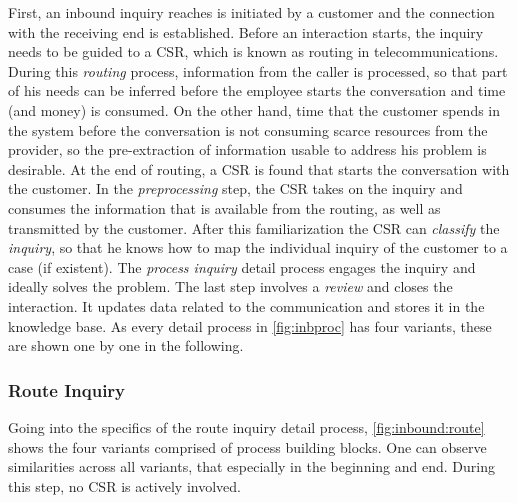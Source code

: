 	 First, an inbound inquiry reaches is initiated by a customer and the connection with the receiving end is established. Before an interaction starts, the inquiry needs to be guided to a \acrshort{CSR}, which is known as routing in telecommunications. During this \textit{routing} process, information from the caller is processed, so that part of his needs can be inferred before the employee starts the conversation and time (and money) is consumed. On the other hand, time that the customer spends in the system before the conversation is not consuming scarce resources from the provider, so the pre-extraction of information usable to address his problem is desirable. At the end of routing, a \acrshort{CSR} is found that starts the conversation with the customer. In the \textit{preprocessing} step, the \acrshort{CSR} takes on the inquiry and consumes the information that is available from the routing, as well as transmitted by the customer. After this familiarization the \acrshort{CSR} can \textit{classify} the \textit{inquiry}, so that he knows how to map the individual inquiry of the customer to a case (if existent). The \textit{process inquiry} detail process engages the inquiry and ideally solves the problem. The last step involves a \textit{review} and closes the interaction. It updates data related to the communication and stores it in the knowledge base. As every detail process in \Fig \ref{fig:inbproc} has four variants, these are shown one by one in the following. 
	 
	 \subsubsection{Route Inquiry}
	 
	 Going into the specifics of the route inquiry detail process, \Fig \ref{fig:inbound:route} shows the four variants comprised of process building blocks. One can observe similarities 
	 across all variants, that especially in the beginning and end. During this step, no \acrshort{CSR} is actively involved.
	 \\
	 
